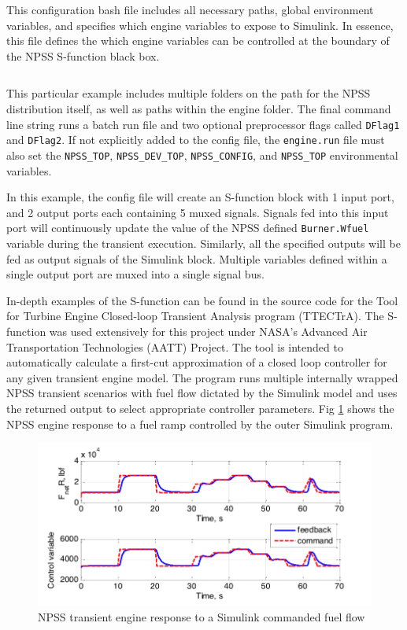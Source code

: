 \documentclass[heading.tex]{subfiles}
\begin{document}
This configuration bash file includes all necessary paths, global environment variables,
and specifies which engine variables to expose to Simulink.
In essence, this file defines the which engine variables can be controlled
at the boundary of the NPSS S-function black box.

 \begin{adjustwidth}{-1cm}{-1cm}
 \inputminted[]{bash}{code/engineConfig.bat}
 \end{adjustwidth} 

This particular example includes multiple folders on the path for the NPSS distribution itself,
as well as paths within the engine folder.
The final command line string runs a batch run file and two optional preprocessor flags called \texttt{DFlag1}
and \texttt{DFlag2}. If not explicitly added to the config file, the \texttt{engine.run} file must also set
the \texttt{NPSS\_TOP}, \texttt{NPSS\_DEV\_TOP}, \texttt{NPSS\_CONFIG}, and \texttt{NPSS\_TOP} environmental variables.

In this example, the config file will create an S-function block with 1 input port,
and 2 output ports each containing 5 muxed signals.
Signals fed into this input port will continuously update the value of the NPSS defined \texttt{Burner.Wfuel}
variable during the transient execution. Similarly, all the specified outputs will be fed as output
signals of the Simulink block.
Multiple variables defined within a single output port are muxed into a single signal bus.

In-depth examples of the S-function can be found in the source code for the
Tool for Turbine Engine Closed-loop Transient Analysis program (TTECTrA). \cite{TTECTrA}
The S-function was used extensively for this project under
NASA's Advanced Air Transportation Technologies (AATT) Project.
The tool is intended to automatically calculate a first-cut approximation of
a closed loop controller for any given transient engine model.
The program runs multiple internally wrapped NPSS transient scenarios
with fuel flow dictated by the Simulink model and uses the returned output to
select appropriate controller parameters. Fig \ref{f:TransientTrace} shows
the NPSS engine response to a fuel ramp controlled by the outer Simulink program.

\begin{figure}[H]
\centering
\includegraphics[width=1.0\textwidth]{images/transientTrace}
\caption{NPSS transient engine response to a Simulink commanded fuel flow}
\label{f:TransientTrace}
\end{figure}
\end{document}
